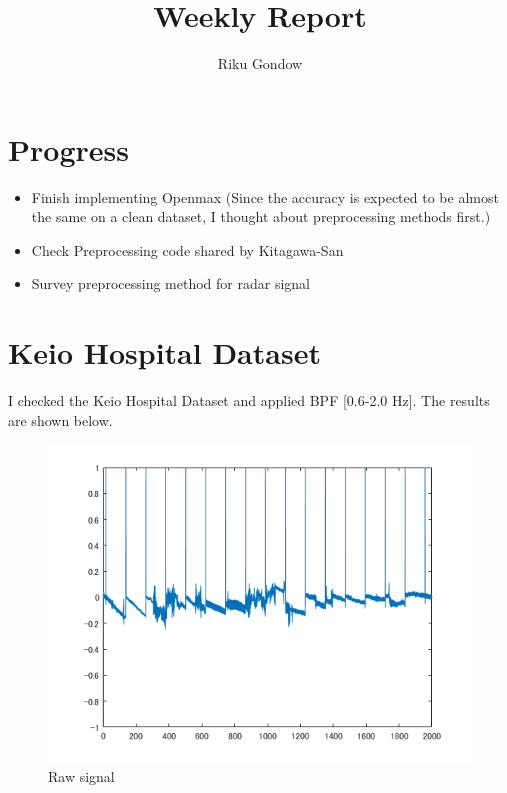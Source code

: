\documentclass[dvipdfmx]{article}
\begin{document}
\title{Weekly Report}
\author{Riku Gondow}
\maketitle
\section{Progress}
\begin{itemize}
    \item Finish implementing Openmax (Since the accuracy is expected to be almost the same on a clean dataset, I thought about preprocessing methods first.)
    \item Check Preprocessing code shared by Kitagawa-San
    \item Survey preprocessing method for radar signal
\end{itemize}


\section{Keio Hospital Dataset}
I checked the Keio Hospital Dataset and applied BPF [0.6-2.0 Hz]. The results are shown below.

\begin{figure}[H]
\begin{center}
\includegraphics[width=0.8\linewidth]{"./img/nonfiltered.png"}
\end{center}
\caption{Raw signal}
\end{figure}
\end{document}
